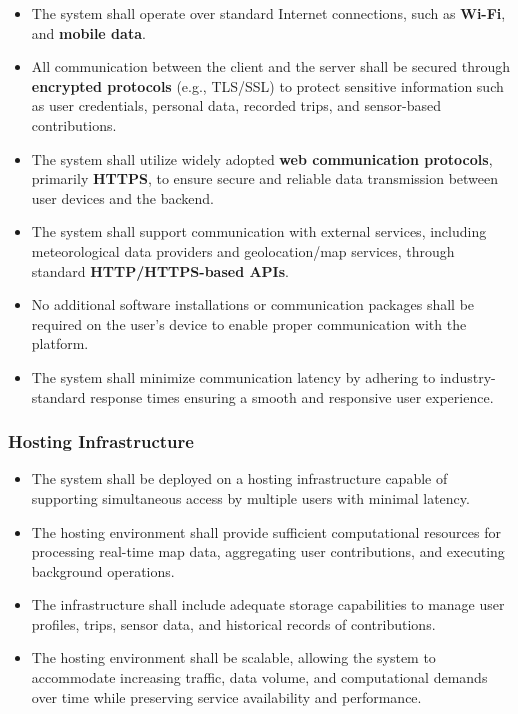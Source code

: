 \begin{itemize}
    \item The system shall operate over standard Internet connections, such as \textbf{Wi-Fi}, and \textbf{mobile data}.
    
    \item All communication between the client and the server shall be secured through \textbf{encrypted protocols} (e.g., TLS/SSL) to protect sensitive information such as user credentials, personal data, recorded trips, and sensor-based contributions.
    
    \item The system shall utilize widely adopted \textbf{web communication protocols}, primarily \textbf{HTTPS}, to ensure secure and reliable data transmission between user devices and the backend.
    
    \item The system shall support communication with external services, including meteorological data providers and geolocation/map services, through standard \textbf{HTTP/HTTPS-based APIs}.
    
    \item No additional software installations or communication packages shall be required on the user’s device to enable proper communication with the platform.
    
    \item The system shall minimize communication latency by adhering to industry-standard response times ensuring a smooth and responsive user experience.
\end{itemize}


\subsubsection*{Hosting Infrastructure}
\begin{itemize}
    \item The system shall be deployed on a hosting infrastructure capable of supporting simultaneous access by multiple users with minimal latency.
    
    \item The hosting environment shall provide sufficient computational resources for processing real-time map data, aggregating user contributions, and executing background operations.

    \item The infrastructure shall include adequate storage capabilities to manage user profiles, trips, sensor data, and historical records of contributions.

    \item The hosting environment shall be scalable, allowing the system to accommodate increasing traffic, data volume, and computational demands over time while preserving service availability and performance.
\end{itemize}



